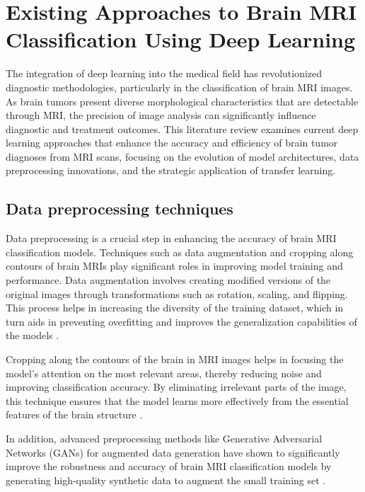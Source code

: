 \section{Existing Approaches to Brain MRI Classification Using Deep Learning}\label{s:lit_review}

The integration of deep learning into the medical field has revolutionized diagnostic methodologies, particularly in the classification of brain MRI images. As brain tumors present diverse morphological characteristics that are detectable through MRI, the precision of image analysis can significantly influence diagnostic and treatment outcomes. This literature review examines current deep learning approaches that enhance the accuracy and efficiency of brain tumor diagnoses from MRI scans, focusing on the evolution of model architectures, data preprocessing innovations, and the strategic application of transfer learning.

\subsection{Data preprocessing techniques}

Data preprocessing is a crucial step in enhancing the accuracy of brain MRI classification models. Techniques such as data augmentation \cite{10183465} and cropping along contours of brain MRIs play significant roles in improving model training and performance. Data augmentation involves creating modified versions of the original images through transformations such as rotation, scaling, and flipping. This process helps in increasing the diversity of the training dataset, which in turn aids in preventing overfitting and improves the generalization capabilities of the models \cite{Paul2017Deep}.

Cropping along the contours of the brain in MRI images helps in focusing the model’s attention on the most relevant areas, thereby reducing noise and improving classification accuracy. By eliminating irrelevant parts of the image, this technique ensures that the model learns more effectively from the essential features of the brain structure \cite{Asif2022Improving}.

In addition, advanced preprocessing methods like Generative Adversarial Networks (GANs) for augmented data generation have shown to significantly improve the robustness and accuracy of brain MRI classification models by generating high-quality synthetic data to augment the small training set \cite{Fahimi2020Generative}.

